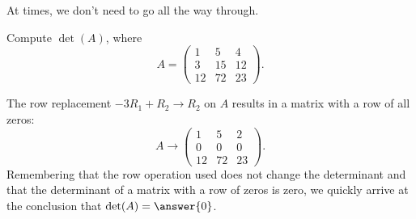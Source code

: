 \documentclass{ximera}
\begin{document}
At times, we don't need to go all the way through.
\begin{example}
  Compute $\det(A)$, where
  \[
    A =
    \begin{pmatrix}
      1 & 5 & 4 \\
      3 & 15 & 12 \\
      12 & 72 & 23
    \end{pmatrix}.
  \]
  \begin{explanation}
    The row replacement $-3R_1 + R_2 \to R_2$ on $A$ results in a matrix
    with a row of all zeros:
    \[
      A \longrightarrow
      \begin{pmatrix}
        1 & 5 & 2 \\
        0 & 0 & 0 \\
        12 & 72 & 23
      \end{pmatrix}.
    \]
    Remembering that the row operation used does not change the determinant and
    that the determinant of a matrix with a row of zeros is zero, we
    quickly arrive at the conclusion that $\det(A) = \answer{0}$.




\end{explanation}
\end{example}
\end{document}
